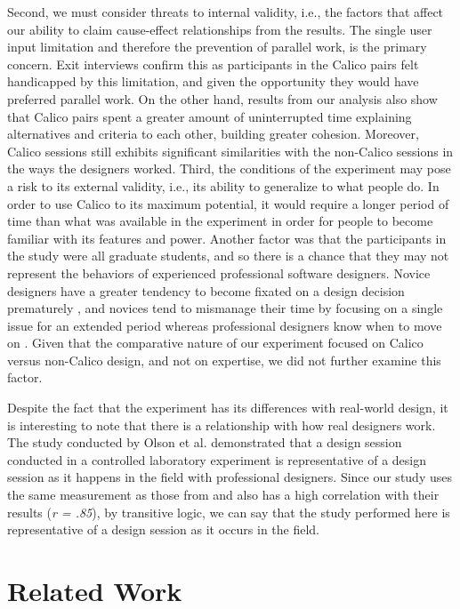 Second, we must consider threats to internal validity, i.e., the factors that affect our ability to claim cause-effect relationships from the results. The single user input limitation and therefore the prevention of parallel work, is the primary concern. Exit interviews confirm this as participants in the Calico pairs felt handicapped by this limitation, and given the opportunity they would have preferred parallel work. On the other hand, results from our analysis also show that Calico pairs spent a greater amount of uninterrupted time explaining alternatives and criteria to each other, building greater cohesion. Moreover, Calico sessions still exhibits significant similarities with the non-Calico sessions in the ways the designers worked.  
Third, the conditions of the experiment may pose a risk to its external validity, i.e., its ability to generalize to what people do. In order to use Calico to its maximum potential, it would require a longer period of time than what was available in the experiment in order for people to become familiar with its features and power. Another factor was that the participants in the study were all graduate students, and so there is a chance that they may not represent the behaviors of experienced professional software designers. Novice designers have a greater tendency to become fixated on a design decision prematurely \citep{Ball}, and novices tend to mismanage their time by focusing on a single issue for an extended period whereas professional designers know when to move on \citep{Baker}. Given that the comparative nature of our experiment focused on Calico versus non-Calico design, and not on expertise, we did not further examine this factor.

Despite the fact that the experiment has its differences with real-world design, it is interesting to note that there is a relationship with how real designers work. The study conducted by Olson et al. \citep{Olsonb} demonstrated that a design session conducted in a controlled laboratory experiment is representative of a design session as it happens in the field with professional designers. Since our study uses the same measurement as those from \citep{Olsonb} and also has a high correlation with their results (\emph{r = .85}), by transitive logic, we can say that the study performed here is representative of a design session as it occurs in the field.

\section{Related Work}
\label{relatedwork}

